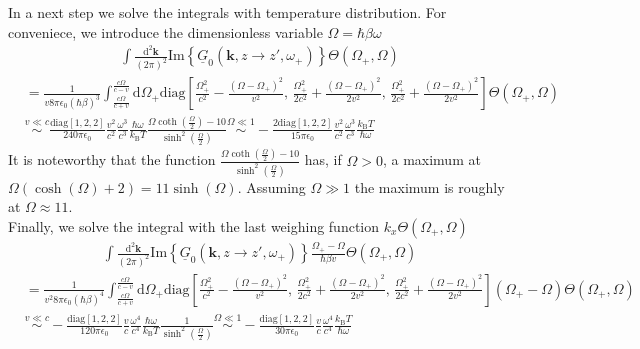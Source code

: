 \documentclass[11pt]{article}
\newcommand{\vv}[1]{\mathbf{#1}}
\newcommand{\dd}[0]{\mathrm{d}}
\newcommand{\kB}[0]{k_\mathrm{B}}
\begin{document}
In a next step we solve the integrals with temperature distribution. For conveniece, we introduce the dimensionless variable $\Omega=\hbar\beta\omega$
\begin{align}
  \int\frac{\dd^2\vv k}{(2\pi)^2}  \mathrm{Im}\left\{\underline{G}_0(\vv k, z\to z',\omega_+)\right\} \Theta(\Omega_+,\Omega)
\end{align}
\begin{align}
  &=
  \frac{1}{v8\pi\epsilon_0(\hbar\beta)^3}
\int_{\frac{c\Omega}{c+v}}^{\frac{c\Omega}{c-v}}\dd \Omega_+
   \mathrm{diag}\left[
   \frac{\Omega_+^2}{c^2}-\frac{(\Omega-\Omega_+)^2}{v^2},\,\frac{\Omega_+^2}{2c^2}+\frac{(\Omega-\Omega_+)^2}{2v^2},\,\frac{\Omega_+^2}{2c^2}+\frac{(\Omega-\Omega_+)^2}{2v^2}\right]\Theta(\Omega_+,\Omega)
\\
&\stackrel{v\ll c}\sim
\frac{\mathrm{diag}[1,2,2]}{240 \pi\epsilon_0 }\frac{v^2}{c^2}
\frac{\omega^3}{c^3}\frac{\hbar\omega }{ \kB T}\frac{\Omega  \coth \left(\frac{\Omega }{2}\right)-10}{ \sinh^2\left(\frac{\Omega }{2}\right)}
\stackrel{\Omega\ll 1}\sim -
\frac{2\mathrm{diag}[1,2,2]}{15 \pi\epsilon_0 }\frac{v^2}{c^2}
\frac{\omega^3}{c^3}\frac{ \kB T}{\hbar\omega }
\end{align}
It is noteworthy that the function $ \frac{\Omega  \coth \left(\frac{\Omega }{2}\right)-10}{ \sinh^2\left(\frac{\Omega }{2}\right)}$ has, if $\Omega>0$, a maximum at $\Omega(\cosh(\Omega)+2)=11\sinh(\Omega)$. Assuming $\Omega \gg 1$ the maximum is roughly at $\Omega\approx 11$.
\\
Finally, we solve the integral with the last weighing function $k_x\Theta(\Omega_+,\Omega)$
\begin{align}
  \int\frac{\dd^2\vv k}{(2\pi)^2}  \mathrm{Im}\left\{\underline{G}_0(\vv k, z\to z',\omega_+)\right\}\frac{\Omega_+-\Omega}{\hbar\beta v} \Theta(\Omega_+,\Omega)
\end{align}
\begin{align}
  &=
  \frac{1}{v^2 8\pi\epsilon_0(\hbar\beta)^4}
\int_{\frac{c\Omega}{c+v}}^{\frac{c\Omega}{c-v}}\dd \Omega_+
   \mathrm{diag}\left[
   \frac{\Omega_+^2}{c^2}-\frac{(\Omega-\Omega_+)^2}{v^2},\,\frac{\Omega_+^2}{2c^2}+\frac{(\Omega-\Omega_+)^2}{2v^2},\,\frac{\Omega_+^2}{2c^2}+\frac{(\Omega-\Omega_+)^2}{2v^2}\right](\Omega_+-\Omega)\Theta(\Omega_+,\Omega)
   \\
   &\stackrel{v\ll c}\sim
 -
 \frac{\mathrm{diag}\left[1,2,2\right]}{120\pi\epsilon_0}\frac{v}{c}\frac{\omega^4}{c^4}
 \frac{\hbar\omega}{\kB T}\frac{1}{\sinh^2 (\frac{\Omega}{2})}
 \stackrel{\Omega\ll 1} \sim
 -
 \frac{\mathrm{diag}\left[1,2,2\right]}{30\pi\epsilon_0}\frac{v}{c}\frac{\omega^4}{c^4}
 \frac{\kB T}{\hbar\omega}
 \end{align}
\end{document}
